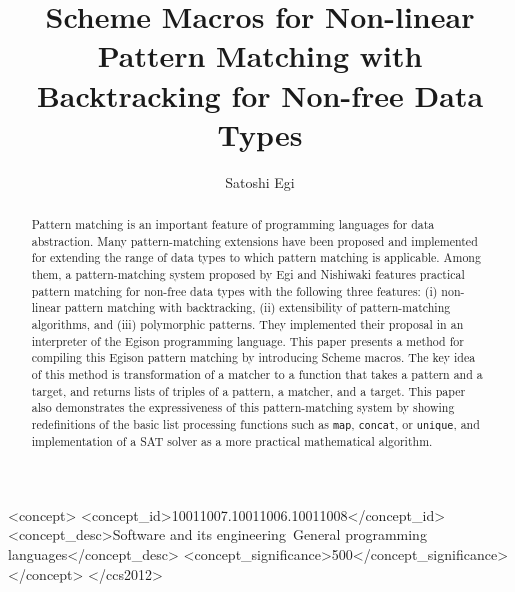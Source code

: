 \documentclass[acmlarge]{acmart}
\begin{document}
\setlength{\pdfpageheight}{\paperheight}
\setlength{\pdfpagewidth}{\paperwidth}

\title{Scheme Macros for Non-linear Pattern Matching with Backtracking for Non-free Data Types}

\author{Satoshi Egi}

\begin{abstract}
  Pattern matching is an important feature of programming languages for data abstraction.
  Many pattern-matching extensions have been proposed and implemented for extending the range of data types to which pattern matching is applicable.
  Among them, a pattern-matching system proposed by Egi and Nishiwaki features practical pattern matching for non-free data types with the following three features: (i) non-linear pattern matching with backtracking, (ii) extensibility of pattern-matching algorithms, and (iii) polymorphic patterns.
  They implemented their proposal in an interpreter of the Egison programming language.
  This paper presents a method for compiling this Egison pattern matching by introducing Scheme macros.
  The key idea of this method is transformation of a matcher to a function that takes a pattern and a target, and returns lists of triples of a pattern, a matcher, and a target.
  This paper also demonstrates the expressiveness of this pattern-matching system by showing redefinitions of the basic list processing functions such as \texttt{map}, \texttt{concat}, or \texttt{unique}, and implementation of a SAT solver as a more practical mathematical algorithm.
  
\end{abstract}

\begin{CCSXML}
<concept>
<concept_id>10011007.10011006.10011008</concept_id>
<concept_desc>Software and its engineering~General programming languages</concept_desc>
<concept_significance>500</concept_significance>
</concept>
</ccs2012>
\end{CCSXML}


\end{document}
